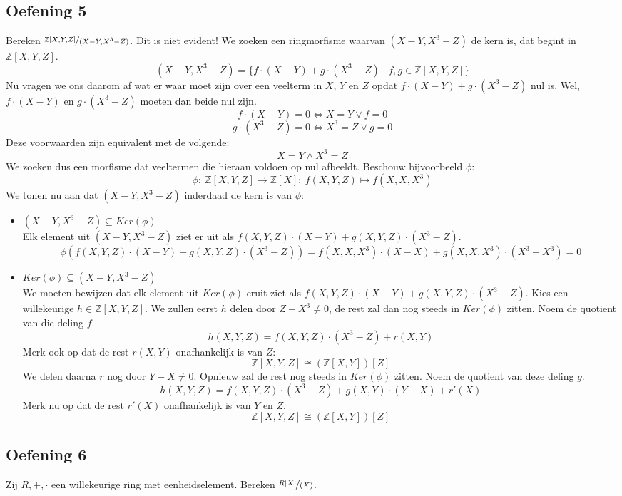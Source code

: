 \documentclass[main.tex]{subfiles}
\begin{document}
\subsection*{Oefening 5}
Bereken $\nicefrac{\mathbb{Z}[X,Y,Z]}{(X-Y,X^{3}-Z)}$.
\noindent
Dit is niet evident!
We zoeken een ringmorfisme waarvan $(X-Y,X^{3}-Z)$ de kern is, dat begint in $\mathbb{Z}[X,Y,Z]$.
\[ (X-Y,X^{3}-Z) = \{ f\cdot (X-Y) + g\cdot (X^{3}-Z) \mid f,g \in \mathbb{Z}[X,Y,Z] \}\]
Nu vragen we ons daarom af wat er waar moet zijn over een veelterm in $X$, $Y$ en $Z$ opdat $f\cdot (X-Y) + g\cdot (X^{3}-Z)$ nul is.
Wel, $f\cdot (X-Y)$ en $g \cdot (X^{3}-Z)$ moeten dan beide nul zijn.
\[ f \cdot (X-Y) = 0 \Leftrightarrow X = Y \vee f = 0\]
\[ g \cdot (X^{3}-Z) = 0 \Leftrightarrow X^{3} = Z \vee g = 0 \]
Deze voorwaarden zijn equivalent met de volgende:
\[ X = Y \wedge X^{3} = Z \]
We zoeken dus een morfisme dat veeltermen die hieraan voldoen op nul afbeeldt.
Beschouw bijvoorbeeld $\phi$:
\[ \phi:\ \mathbb{Z}[X,Y,Z] \rightarrow \mathbb{Z}[X]:\ f(X,Y,Z) \mapsto f(X,X,X^{3}) \]
We tonen nu aan dat $(X-Y,X^{3}-Z)$ inderdaad de kern is van $\phi$:
\begin{itemize}
\item $(X-Y,X^{3}-Z) \subseteq Ker(\phi)$\\
  Elk element uit $(X-Y,X^{3}-Z)$ ziet er uit als $f(X,Y,Z)\cdot (X-Y) + g(X,Y,Z)\cdot (X^{3}-Z)$.
  \[ \phi(f(X,Y,Z)\cdot (X-Y) + g(X,Y,Z)\cdot (X^{3}-Z)) = f(X,X,X^{3})\cdot (X-X) + g(X,X,X^{3})\cdot (X^{3}-X^{3}) = 0 \]
\item $Ker(\phi) \subseteq(X-Y,X^{3}-Z) $\\
  We moeten bewijzen dat elk element uit $Ker(\phi)$ eruit ziet als $f(X,Y,Z)\cdot (X-Y) + g(X,Y,Z)\cdot (X^{3}-Z)$.
  Kies een willekeurige $h\in \mathbb{Z}[X,Y,Z]$.
  We zullen eerst $h$ delen door $Z-X^{3}\neq 0$, de rest zal dan nog steeds in $Ker(\phi)$ zitten.
  Noem de quotient van die deling $f$.
  \[ h(X,Y,Z) = f(X,Y,Z)\cdot(X^{3}-Z) + r(X,Y) \]
  Merk ook op dat de rest $r(X,Y)$ onafhankelijk is van $Z$:
  \[ \mathbb{Z}[X,Y,Z] \cong (\mathbb{Z}[X,Y])[Z] \]
  We delen daarna $r$ nog door $Y-X \neq 0$. Opnieuw zal de rest nog steeds in $Ker(\phi)$ zitten.
  Noem de quotient van deze deling $g$.
  \[ h(X,Y,Z) = f(X,Y,Z)\cdot (X^{3}-Z) + g(X,Y) \cdot (Y-X) + r'(X) \]
  Merk nu op dat de rest $r'(X)$ onafhankelijk is van $Y$ en $Z$.
  \[ \mathbb{Z}[X,Y,Z] \cong (\mathbb{Z}[X,Y])[Z] \]
\end{itemize}

\subsection*{Oefening 6}
Zij $R,+,\cdot$ een willekeurige ring met eenheidselement.
Bereken $\nicefrac{R[X]}{(X)}$.
\end{document}
